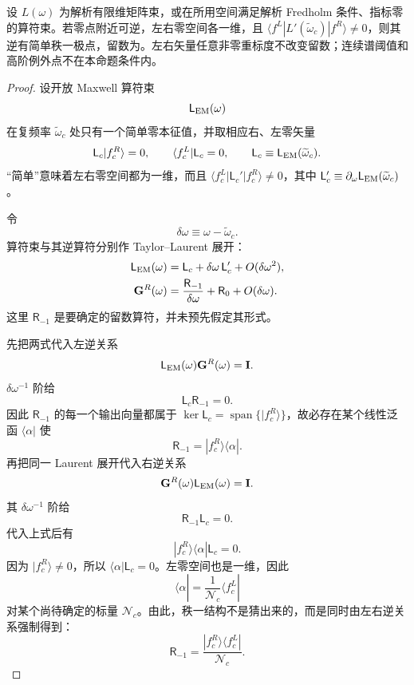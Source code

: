 \begin{lemma}[解析算符束简单零点的逆留数]
设 $L(\omega)$ 为解析有限维矩阵束，或在所用空间满足解析 Fredholm 条件、指标零的算符束。若零点附近可逆，左右零空间各一维，且 $\langle f^L|L\prime(\widetilde\omega_c)|f^R\rangle\ne0$，则其逆有简单秩一极点，留数为。左右矢量任意非零重标度不改变留数；连续谱阈值和高阶例外点不在本命题条件内。
\end{lemma}
\begin{proof}
设开放 Maxwell 算符束
\[
\mathsf L_{\rm EM}(\omega)
\]
在复频率 \(\widetilde\omega_c\) 处只有一个简单零本征值，并取相应右、左零矢量
\[
\mathsf L_c|f_c^R\rangle=0,
\qquad
\langle f_c^L|\mathsf L_c=0,
\qquad
\mathsf L_c\equiv\mathsf L_{\rm EM}(\widetilde\omega_c).
\]
“简单”意味着左右零空间都为一维，而且
\(\langle f_c^L|\mathsf L_c'|f_c^R\rangle\neq0\)，其中
\(\mathsf L_c'\equiv\partial_\omega\mathsf L_{\rm EM}(\widetilde\omega_c)\)。

令
\[
\delta\omega\equiv\omega-\widetilde\omega_c.
\]
算符束与其逆算符分别作 Taylor--Laurent 展开：
\begin{align*}
\mathsf L_{\rm EM}(\omega)
&=\mathsf L_c+\delta\omega\,\mathsf L_c'
+O(\delta\omega^2),\\
\mathbf G^R(\omega)
&=\frac{\mathsf R_{-1}}{\delta\omega}
+\mathsf R_0+O(\delta\omega).
\end{align*}
这里 \(\mathsf R_{-1}\) 是要确定的留数算符，并未预先假定其形式。

先把两式代入左逆关系
\[
\mathsf L_{\rm EM}(\omega)\mathbf G^R(\omega)=\mathbf I.
\]
\(\delta\omega^{-1}\) 阶给
\[
\mathsf L_c\mathsf R_{-1}=0.
\]
因此 \(\mathsf R_{-1}\) 的每一个输出向量都属于
\(\ker\mathsf L_c=\operatorname{span}\{|f_c^R\rangle\}\)，故必存在某个线性泛函
\(\langle\alpha|\) 使
\[
\mathsf R_{-1}=|f_c^R\rangle\langle\alpha|.
\]
再把同一 Laurent 展开代入右逆关系
\[
\mathbf G^R(\omega)\mathsf L_{\rm EM}(\omega)=\mathbf I.
\]
其 \(\delta\omega^{-1}\) 阶给
\[
\mathsf R_{-1}\mathsf L_c=0.
\]
代入上式后有
\[
|f_c^R\rangle\langle\alpha|\mathsf L_c=0.
\]
因为 \(|f_c^R\rangle\neq0\)，所以
\(\langle\alpha|\mathsf L_c=0\)。左零空间也是一维，因此
\[
\langle\alpha|=\frac{1}{\mathcal N_c}\langle f_c^L|
\]
对某个尚待确定的标量 \(\mathcal N_c\)。由此，秩一结构不是猜出来的，而是同时由左右逆关系强制得到：
\[
\mathsf R_{-1}
=\frac{|f_c^R\rangle\langle f_c^L|}{\mathcal N_c}.
\]


\end{proof}
